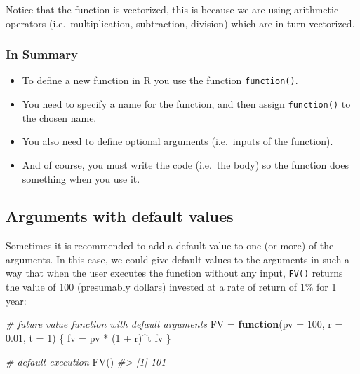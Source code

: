 \documentclass[
]{book}
\newenvironment{Shaded}{\begin{snugshade}}{\end{snugshade}}
\newcommand{\AttributeTok}[1]{\textcolor[rgb]{0.77,0.63,0.00}{#1}}
\newcommand{\CommentTok}[1]{\textcolor[rgb]{0.56,0.35,0.01}{\textit{#1}}}
\newcommand{\ControlFlowTok}[1]{\textcolor[rgb]{0.13,0.29,0.53}{\textbf{#1}}}
\newcommand{\DecValTok}[1]{\textcolor[rgb]{0.00,0.00,0.81}{#1}}
\newcommand{\FloatTok}[1]{\textcolor[rgb]{0.00,0.00,0.81}{#1}}
\newcommand{\FunctionTok}[1]{\textcolor[rgb]{0.00,0.00,0.00}{#1}}
\newcommand{\NormalTok}[1]{#1}
\newcommand{\OtherTok}[1]{\textcolor[rgb]{0.56,0.35,0.01}{#1}}
\newcommand{\SpecialCharTok}[1]{\textcolor[rgb]{0.00,0.00,0.00}{#1}}
\begin{document}
Notice that the function is vectorized, this is because we are using arithmetic
operators (i.e.~multiplication, subtraction, division) which are in turn
vectorized.

\hypertarget{in-summary}{%
\subsubsection*{In Summary}\label{in-summary}}

\begin{itemize}
\item
  To define a new function in R you use the function \texttt{function()}.
\item
  You need to specify a name for the function, and then assign \texttt{function()}
  to the chosen name.
\item
  You also need to define optional arguments (i.e.~inputs of the function).
\item
  And of course, you must write the code (i.e.~the body) so the function does
  something when you use it.
\end{itemize}

\hypertarget{arguments-with-default-values}{%
\subsection{Arguments with default values}\label{arguments-with-default-values}}

Sometimes it is recommended to add a default value to one (or more) of the
arguments. In this case, we could give default values to the arguments in such
a way that when the user executes the function without any input, \texttt{FV()}
returns the value of 100 (presumably dollars) invested at a rate of return of
1\% for 1 year:

\begin{Shaded}
\begin{Highlighting}[]
\CommentTok{\# future value function with default arguments}
\NormalTok{FV }\OtherTok{=} \ControlFlowTok{function}\NormalTok{(}\AttributeTok{pv =} \DecValTok{100}\NormalTok{, }\AttributeTok{r =} \FloatTok{0.01}\NormalTok{, }\AttributeTok{t =} \DecValTok{1}\NormalTok{) \{}
\NormalTok{  fv }\OtherTok{=}\NormalTok{ pv }\SpecialCharTok{*}\NormalTok{ (}\DecValTok{1} \SpecialCharTok{+}\NormalTok{ r)}\SpecialCharTok{\^{}}\NormalTok{t}
\NormalTok{  fv}
\NormalTok{\}}

\CommentTok{\# default execution}
\FunctionTok{FV}\NormalTok{()}
\CommentTok{\#\textgreater{} [1] 101}
\end{Highlighting}
\end{Shaded}
\end{document}
